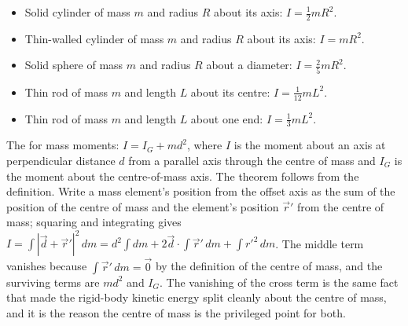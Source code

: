 \begin{itemize}[leftmargin=*]
  \item Solid cylinder of mass $m$ and radius $R$ about its axis:
    $I = \tfrac{1}{2} m R^2$.
  \item Thin-walled cylinder of mass $m$ and radius $R$ about its
    axis: $I = m R^2$.
  \item Solid sphere of mass $m$ and radius $R$ about a diameter:
    $I = \tfrac{2}{5} m R^2$.
  \item Thin rod of mass $m$ and length $L$ about its centre: $I =
    \tfrac{1}{12} m L^2$.
  \item Thin rod of mass $m$ and length $L$ about one end: $I =
    \tfrac{1}{3} m L^2$.
\end{itemize}

The  for mass moments: $I = I_G + m
d^2$, where $I$ is the moment about an axis at perpendicular distance
$d$ from a parallel axis through the centre of mass and $I_G$ is the
moment about the centre-of-mass axis. The theorem follows from the
definition. Write a mass element's position from the offset axis as the
sum of the position of the centre of mass and the element's position
$\vec{r}'$ from the centre of mass; squaring and integrating gives $I=
\int|\vec{d}+\vec{r}'|^{2}\,dm=d^{2}\!\int dm+2\vec{d}\cdot\!\int\vec{r}'
\,dm+\int r'^{2}\,dm$. The middle term vanishes because $\int\vec{r}'\,dm
=\vec{0}$ by the definition of the centre of mass, and the surviving
terms are $md^{2}$ and $I_{G}$. The vanishing of the cross term is the
same fact that made the rigid-body kinetic energy split cleanly about the
centre of mass, and it is the reason the centre of mass is the privileged
point for both.

